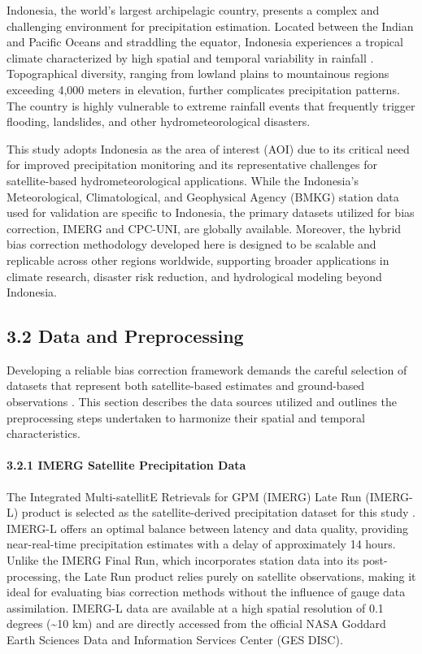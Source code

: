 \documentclass[
]{article}
\begin{document}
Indonesia, the world's largest archipelagic country, presents a complex
and challenging environment for precipitation estimation. Located
between the Indian and Pacific Oceans and straddling the equator,
Indonesia experiences a tropical climate characterized by high spatial
and temporal variability in rainfall \cite{ref19,ref20}. Topographical
diversity, ranging from lowland plains to mountainous regions exceeding
4,000 meters in elevation, further complicates precipitation patterns.
The country is highly vulnerable to extreme rainfall events that
frequently trigger flooding, landslides, and other hydrometeorological
disasters.

This study adopts Indonesia as the area of interest (AOI) due to its
critical need for improved precipitation monitoring and its
representative challenges for satellite-based hydrometeorological
applications. While the Indonesia's Meteorological, Climatological, and
Geophysical Agency (BMKG) station data used for validation are specific
to Indonesia, the primary datasets utilized for bias correction, IMERG
and CPC-UNI, are globally available. Moreover, the hybrid bias
correction methodology developed here is designed to be scalable and
replicable across other regions worldwide, supporting broader
applications in climate research, disaster risk reduction, and
hydrological modeling beyond Indonesia.

\subsection{3.2 Data and Preprocessing}\label{data-and-preprocessing}

Developing a reliable bias correction framework demands the careful
selection of datasets that represent both satellite-based estimates and
ground-based observations \cite{ref22}. This section describes the data
sources utilized and outlines the preprocessing steps undertaken to
harmonize their spatial and temporal characteristics.

\paragraph{3.2.1 IMERG Satellite Precipitation
Data}\label{imerg-satellite-precipitation-data}

The Integrated Multi-satellitE Retrievals for GPM (IMERG) Late Run
(IMERG-L) product is selected as the satellite-derived precipitation
dataset for this study \cite{ref2,ref21}. IMERG-L offers an optimal balance
between latency and data quality, providing near-real-time precipitation
estimates with a delay of approximately 14 hours. Unlike the IMERG Final
Run, which incorporates station data into its post-processing, the Late
Run product relies purely on satellite observations, making it ideal for
evaluating bias correction methods without the influence of gauge data
assimilation. IMERG-L data are available at a high spatial resolution of
0.1 degrees (\textasciitilde10 km) and are directly accessed from the
official NASA Goddard Earth Sciences Data and Information Services
Center (GES DISC).
\end{document}
